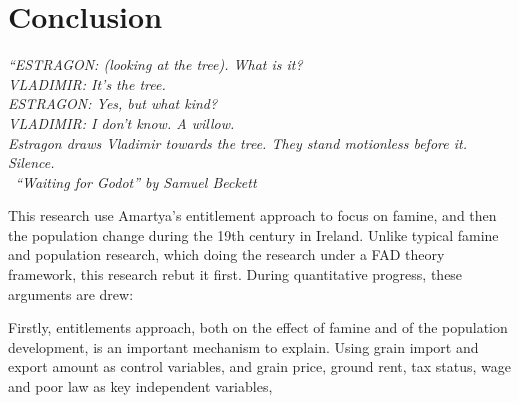 \chapter{Conclusion}

\textit{
    ``ESTRAGON: (looking at the tree). What is it? \\
    VLADIMIR: It's the tree. \\
    ESTRAGON: Yes, but what kind? \\
    VLADIMIR: I don't know. A willow. \\
    Estragon draws Vladimir towards the tree. They stand 
    motionless before it. Silence. \\
    \textemdash\ ``Waiting for Godot'' by Samuel Beckett
}

This research use Amartya's entitlement approach to focus on famine, and then the population change during the 19th century in Ireland. Unlike typical famine and population research, which doing the research under a FAD theory framework, this research rebut it first. During quantitative progress, these arguments are drew: 

Firstly, entitlements approach, both on the effect of famine and of the population development, is an important mechanism to explain. Using grain import and export amount as control variables, and grain price, ground rent, tax status, wage and poor law as key independent variables, 
